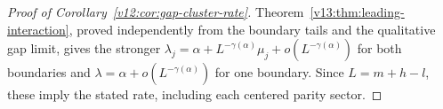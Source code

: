 \begin{proof}[Proof of Corollary~\ref{v12:cor:gap-cluster-rate}]
Theorem~\ref{v13:thm:leading-interaction}, proved independently from the
boundary tails and the qualitative gap limit, gives the stronger
$\lambda_j=\alpha+L^{-\gamma(\alpha)}\mu_j+o(L^{-\gamma(\alpha)})$
for both boundaries and $\lambda=\alpha+o(L^{-\gamma(\alpha)})$
for one boundary. Since $L=m+h-l$, these imply the stated rate,
including each centered parity sector.
\end{proof}


